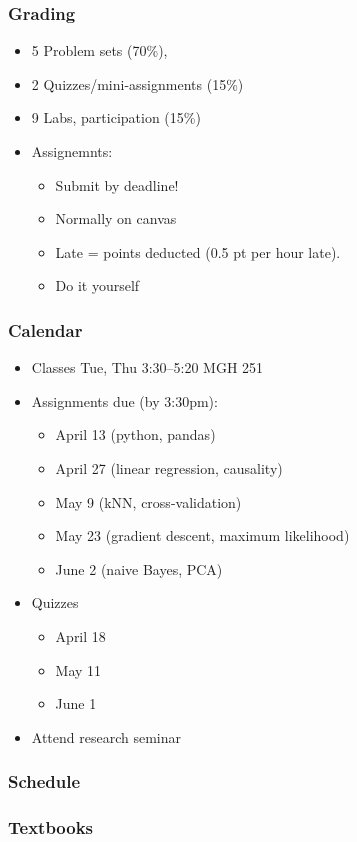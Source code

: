 \documentclass[mathserif, xcolor=table, svgnames]{beamer}
\begin{document}
\begin{frame}
  \frametitle{Grading}
  \begin{itemize}
  \item 5 Problem sets (70\%), 
  \item 2 Quizzes/mini-assignments (15\%)
  \item 9 Labs, participation (15\%)
  \item Assignemnts:
    \begin{itemize}
    \item Submit by deadline!
    \item Normally on canvas
    \item Late = points deducted (0.5 pt per hour late).
    \item Do it yourself
    \end{itemize}
  \end{itemize}
\end{frame}


\begin{frame}
  \frametitle{Calendar}
  \begin{itemize}
  \item Classes Tue, Thu 3:30--5:20 MGH 251
  \item Assignments due (by 3:30pm):
    \begin{itemize}
    \item April 13 (python, pandas)
    \item April 27 (linear regression, causality)
    \item May 9 (kNN, cross-validation)
    \item May 23 (gradient descent, maximum likelihood)
    \item June 2 (naive Bayes, PCA)
    \end{itemize}
  \item Quizzes
    \begin{itemize}
    \item April 18
    \item May 11
    \item June 1
    \end{itemize}
  \item Attend research seminar
  \end{itemize}
\end{frame}

\begin{frame}
  \frametitle{Schedule}
\end{frame}

\begin{frame}
  \frametitle{Textbooks}
  
\end{frame}
\end{document}
